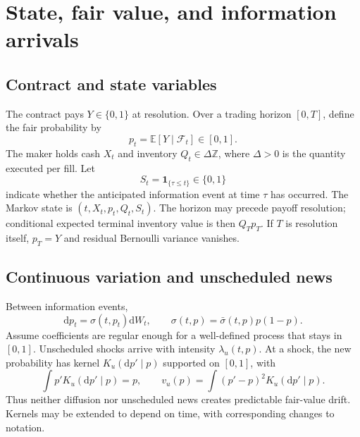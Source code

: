 \documentclass[11pt]{article}
\newcommand{\E}{\mathbb E}
\newcommand{\1}{\mathbf 1}
\newcommand{\dd}{\mathrm d}
\newcommand{\F}{\mathcal F}
\begin{document}
\section{State, fair value, and information arrivals}
\subsection{Contract and state variables}
The contract pays $Y\in\{0,1\}$ at resolution. Over a trading horizon $[0,T]$,
define the fair probability by
\begin{equation}
 p_t=\E[Y\mid\F_t]\in[0,1].
\end{equation}
The maker holds cash $X_t$ and inventory $Q_t\in\Delta\mathbb Z$, where
$\Delta>0$ is the quantity executed per fill. Let
\begin{equation}
 S_t=\1_{\{\tau\le t\}}\in\{0,1\}
\end{equation}
indicate whether the anticipated information event at time $\tau$ has occurred.
The Markov state is $(t,X_t,p_t,Q_t,S_t)$. The horizon may precede payoff
resolution; conditional expected terminal inventory value is then $Q_Tp_T$.
If $T$ is resolution itself, $p_T=Y$ and residual Bernoulli variance vanishes.

\subsection{Continuous variation and unscheduled news}
Between information events,
\begin{equation}
 \dd p_t=\sigma(t,p_t)\dd W_t,
 \qquad \sigma(t,p)=\bar\sigma(t,p)p(1-p).
\end{equation}
Assume coefficients are regular enough for a well-defined process that stays
in $[0,1]$. Unscheduled shocks arrive with intensity $\lambda_u(t,p)$.
At a shock, the new probability has kernel $K_u(\dd p'\mid p)$ supported on
$[0,1]$, with
\begin{equation}
 \int p'K_u(\dd p'\mid p)=p,
 \qquad v_u(p)=\int(p'-p)^2K_u(\dd p'\mid p).
\end{equation}
Thus neither diffusion nor unscheduled news creates predictable fair-value
drift. Kernels may be extended to depend on time, with corresponding changes
to notation.
\end{document}

